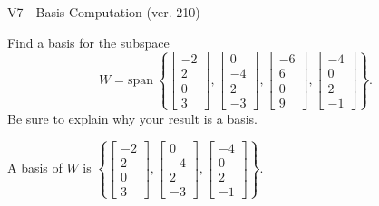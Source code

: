 \begin{exercise}
  \begin{exerciseTitle}V7 - Basis Computation (ver. 210)\end{exerciseTitle}
  \begin{exerciseStatement}
    Find a basis for the subspace 
\[W=\mathrm{span}\ \left\{\left[\begin{array}{r}
-2 \\
2 \\
0 \\
3
\end{array}\right] , \left[\begin{array}{r}
0 \\
-4 \\
2 \\
-3
\end{array}\right] , \left[\begin{array}{r}
-6 \\
6 \\
0 \\
9
\end{array}\right] , \left[\begin{array}{r}
-4 \\
0 \\
2 \\
-1
\end{array}\right]\right\}.\]
 Be sure to explain why your result is a basis.


  \end{exerciseStatement}
  \begin{exerciseAnswer}
   A basis of \(W\) is  \(\left\{\left[\begin{array}{r}
-2 \\
2 \\
0 \\
3
\end{array}\right] , \left[\begin{array}{r}
0 \\
-4 \\
2 \\
-3
\end{array}\right] , \left[\begin{array}{r}
-4 \\
0 \\
2 \\
-1
\end{array}\right]\right\}\).
  


  \end{exerciseAnswer}
\end{exercise}